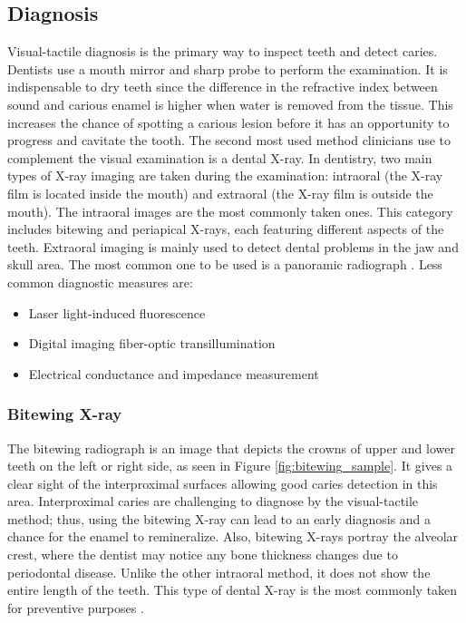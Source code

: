 \subsection{Diagnosis}
Visual-tactile diagnosis is the primary way to inspect teeth and detect caries. Dentists use a mouth mirror and sharp probe to perform the examination. It is indispensable to dry teeth since the difference in the refractive index between sound and carious enamel is higher when water is removed from the tissue. This increases the chance of spotting a carious lesion before it has an opportunity to progress and cavitate the tooth.
The second most used method clinicians use to complement the visual examination is a dental X-ray. In dentistry, two main types of X-ray imaging are taken during the examination: intraoral (the X-ray film is located inside the mouth) and extraoral (the X-ray film is outside the mouth). The intraoral images are the most commonly taken ones. This category includes bitewing and periapical X-rays, each featuring different aspects of the teeth. Extraoral imaging is mainly used to detect dental problems in the jaw and skull area. The most common one to be used is a panoramic radiograph \cite{2015}. \newline
Less common diagnostic measures are:

\begin{itemize}
    \item Laser light-induced fluorescence
    \item Digital imaging fiber-optic transillumination
    \item Electrical conductance and impedance measurement
\end{itemize}

\subsubsection{Bitewing X-ray}
The bitewing radiograph is an image that depicts the crowns of upper and lower teeth on the left or right side, as seen in Figure \ref{fig:bitewing_sample}. It gives a clear sight of the interproximal surfaces allowing good caries detection in this area. Interproximal caries are challenging to diagnose by the visual-tactile method; thus, using the bitewing X-ray can lead to an early diagnosis and a chance for the enamel to remineralize. Also, bitewing X-rays portray the alveolar crest, where the dentist may notice any bone thickness changes due to periodontal disease. Unlike the other intraoral method, it does not show the entire length of the teeth. This type of dental X-ray is the most commonly taken for preventive purposes \cite{2015}.

